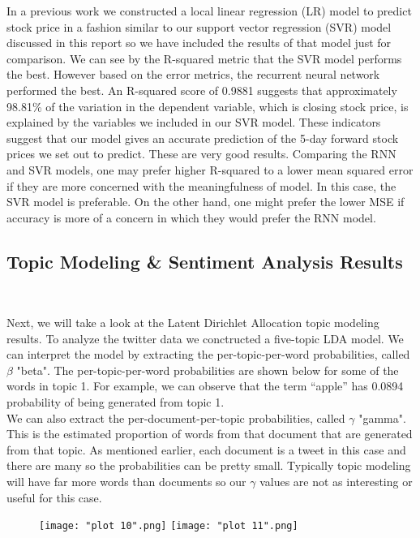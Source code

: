 \documentclass[11pt, oneside]{article}   	%
\begin{document}
 In a previous work we constructed a local linear regression (LR) model to predict stock price in a fashion similar to our support vector regression (SVR) model discussed in this report so we have included the results of that model just for comparison. We can see by the R-squared metric that the SVR model performs the best. However based on the error metrics, the recurrent neural network performed the best. An R-squared score of 0.9881 suggests that approximately 98.81\% of the variation in the dependent variable, which is closing stock price, is explained by the variables we included in our SVR model. These indicators suggest that our model gives an accurate prediction of the 5-day forward stock prices we set out to predict. These are very good results. Comparing the RNN and SVR models, one may prefer higher R-squared to a lower mean squared error if they are more concerned with the meaningfulness of model. In this case, the SVR model is preferable. On the other hand, one might prefer the lower MSE if accuracy is more of a concern in which they would prefer the RNN model.

\newpage
\subsection{Topic Modeling \& Sentiment Analysis Results}\

Next, we will take a look at the Latent Dirichlet Allocation topic modeling results. To analyze the twitter data we conctructed a five-topic LDA model. We can interpret the model by extracting the per-topic-per-word probabilities, called  $\beta$ "beta". The  per-topic-per-word probabilities are shown below for some of the words in topic 1. For example, we can observe that the term “apple” has 0.0894 probability of being generated from topic 1. \\

We can also extract the per-document-per-topic probabilities, called $\gamma$ "gamma". This is the estimated proportion of words from that document that are generated from that topic. As mentioned earlier, each document is a tweet in this case and there are many so the probabilities can be pretty small. Typically topic modeling will have far more words than documents so our $\gamma$ values are not as interesting or useful for this case.

\begin{figure}[!h] %
   \centering
   \texttt{[image: "plot 10".png]} 
   \texttt{[image: "plot 11".png]}
\end{figure}
\end{document}
